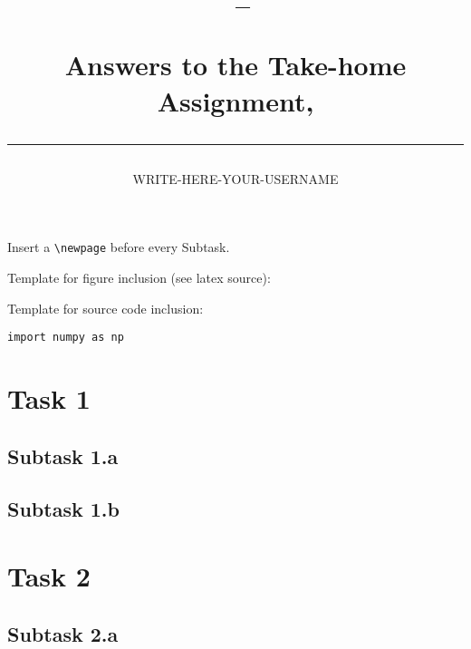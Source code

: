 \documentclass[a4paper,10pt]{article}
\author{WRITE-HERE-YOUR-USERNAME}
\title{\begin{flushleft}
\vspace{-4ex}
\courseid~-- \coursename \\[0.2cm]
{\Large Answers to the Take-home Assignment, \term \\[3ex]
\hrule}
\end{flushleft}
}
\date{}
\begin{document}
\maketitle





Insert a \verb=\newpage= before every Subtask.

\bigskip
\bigskip
Template for figure inclusion (see latex source):

\begin{figure}[htb]
\begin{center}
\end{center}
\end{figure}


\bigskip
\bigskip
Template for source code inclusion:

\begin{lstlisting}
import numpy as np

\end{lstlisting}



\clearpage\newpage
\section*{Task 1}
\subsection*{Subtask 1.a}
\clearpage\newpage
\subsection*{Subtask 1.b}


\clearpage\newpage
\section*{Task 2}
\subsection*{Subtask 2.a}
\end{document}
